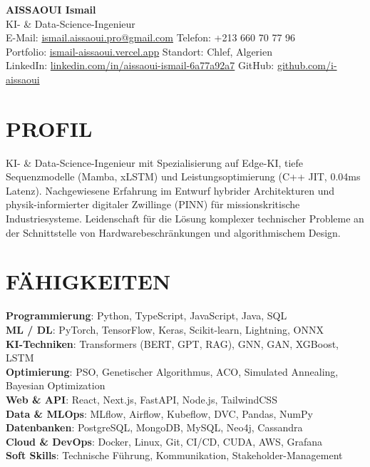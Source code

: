 \documentclass[a4paper,12pt]{article}
\begin{document}
\begin{center}
    {\Huge\bfseries\color{titleblue} AISSAOUI Ismail}\\[4pt]
    {\Large KI- \& Data-Science-Ingenieur}\\[6pt]

    {\normalsize
    E-Mail: \href{mailto:ismail.aissaoui.pro@gmail.com}{ismail.aissaoui.pro@gmail.com} \quad
    Telefon: +213 660 70 77 96 \\
    Portfolio: \href{https://ismail-aissaoui.vercel.app}{ismail-aissaoui.vercel.app} \quad
    Standort: Chlef, Algerien \\
    LinkedIn: \href{https://linkedin.com/in/aissaoui-ismail-6a77a92a7}{linkedin.com/in/aissaoui-ismail-6a77a92a7} \quad
    GitHub: \href{https://github.com/i-aissaoui}{github.com/i-aissaoui}
    }
\end{center}

\section{PROFIL}
KI- \& Data-Science-Ingenieur mit Spezialisierung auf Edge-KI, tiefe Sequenzmodelle (Mamba, xLSTM) und Leistungsoptimierung (C++ JIT, 0.04ms Latenz). Nachgewiesene Erfahrung im Entwurf hybrider Architekturen und physik-informierter digitaler Zwillinge (PINN) für missionskritische Industriesysteme. Leidenschaft für die Lösung komplexer technischer Probleme an der Schnittstelle von Hardwarebeschränkungen und algorithmischem Design.

\section{FÄHIGKEITEN}
\setlength{\parskip}{-3pt}
{\normalsize
\textbf{Programmierung}: Python, TypeScript, JavaScript, Java, SQL \\
\textbf{ML / DL}: PyTorch, TensorFlow, Keras, Scikit-learn, Lightning, ONNX \\
\textbf{KI-Techniken}: Transformers (BERT, GPT, RAG), GNN, GAN, XGBoost, LSTM \\
\textbf{Optimierung}: PSO, Genetischer Algorithmus, ACO, Simulated Annealing, Bayesian Optimization \\
\textbf{Web \& API}: React, Next.js, FastAPI, Node.js, TailwindCSS \\
\textbf{Data \& MLOps}: MLflow, Airflow, Kubeflow, DVC, Pandas, NumPy \\
\textbf{Datenbanken}: PostgreSQL, MongoDB, MySQL, Neo4j, Cassandra \\
\textbf{Cloud \& DevOps}: Docker, Linux, Git, CI/CD, CUDA, AWS, Grafana \\
\textbf{Soft Skills}: Technische Führung, Kommunikation, Stakeholder-Management
}
\end{document}
